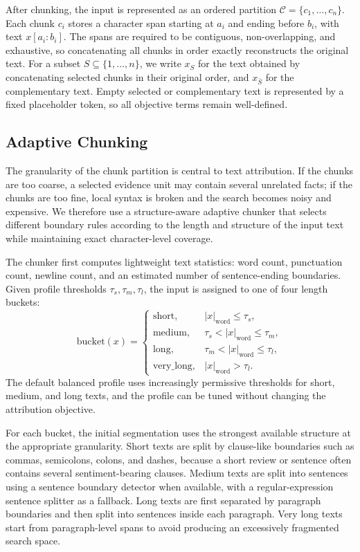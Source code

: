 After chunking, the input is represented as an ordered partition
$\mathcal{C}=\{c_1,\ldots,c_n\}$.  Each chunk $c_i$ stores a character span
starting at $a_i$ and ending before $b_i$, with text $x[a_i:b_i]$.  The spans
are required to be contiguous, non-overlapping, and exhaustive, so concatenating
all chunks in order exactly reconstructs the original text.  For a subset
$S \subseteq \{1,\ldots,n\}$, we write $x_S$ for the text obtained by
concatenating selected chunks in their original order, and $x_{\bar{S}}$ for the
complementary text.  Empty selected or complementary text is represented by a
fixed placeholder token, so all objective terms remain well-defined.

\subsection{Adaptive Chunking}

The granularity of the chunk partition is central to text attribution.  If the
chunks are too coarse, a selected evidence unit may contain several unrelated
facts; if the chunks are too fine, local syntax is broken and the search becomes
noisy and expensive.  We therefore use a structure-aware adaptive chunker that
selects different boundary rules according to the length and structure of the
input text while maintaining exact character-level coverage.

The chunker first computes lightweight text statistics: word count, punctuation
count, newline count, and an estimated number of sentence-ending boundaries.
Given profile thresholds $\tau_s,\tau_m,\tau_l$, the input is assigned to one of
four length buckets:
\[
    \mathrm{bucket}(x)=
    \begin{cases}
    \mathrm{short}, & |x|_{\mathrm{word}} \leq \tau_s,\\
    \mathrm{medium}, & \tau_s < |x|_{\mathrm{word}} \leq \tau_m,\\
    \mathrm{long}, & \tau_m < |x|_{\mathrm{word}} \leq \tau_l,\\
    \mathrm{very\_long}, & |x|_{\mathrm{word}} > \tau_l.
    \end{cases}
\]
The default balanced profile uses increasingly permissive thresholds for short,
medium, and long texts, and the profile can be tuned without changing the
attribution objective.

For each bucket, the initial segmentation uses the strongest available
structure at the appropriate granularity.  Short texts are split by clause-like
boundaries such as commas, semicolons, colons, and dashes, because a short review
or sentence often contains several sentiment-bearing clauses.  Medium texts are
split into sentences using a sentence boundary detector when available, with a
regular-expression sentence splitter as a fallback.  Long texts are first
separated by paragraph boundaries and then split into sentences inside each
paragraph.  Very long texts start from paragraph-level spans to avoid producing
an excessively fragmented search space.

